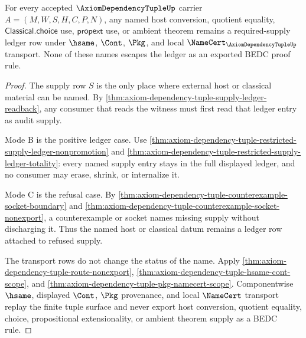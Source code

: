 \begin{theorem}
\label{thm:axiom-dependency-tuple-host-supply-nonescape}
For every accepted $\AxiomDependencyTupleUp$ carrier
$A=(M,W,S,H,C,P,N)$, any named host conversion, quotient equality,
$\mathsf{Classical.choice}$ use, $\mathsf{propext}$ use, or ambient theorem
remains a required-supply ledger row under $\hsame$, $\Cont$, $\Pkg$, and local
$\NameCert_{\AxiomDependencyTupleUp}$ transport. None of these names escapes
the ledger as an exported BEDC proof rule.
\end{theorem}
\begin{proof}
The supply row $S$ is the only place where external host or classical material
can be named. By \autoref{thm:axiom-dependency-tuple-supply-ledger-readback},
any consumer that reads the witness must first read that ledger entry as audit
supply.

Mode B is the positive ledger case. Use
\autoref{thm:axiom-dependency-tuple-restricted-supply-ledger-nonpromotion} and
\autoref{thm:axiom-dependency-tuple-restricted-supply-ledger-totality}: every
named supply entry stays in the full displayed ledger, and no consumer may
erase, shrink, or internalize it.

Mode C is the refusal case. By
\autoref{thm:axiom-dependency-tuple-counterexample-socket-boundary} and
\autoref{thm:axiom-dependency-tuple-counterexample-socket-nonexport}, a
counterexample or socket names missing supply without discharging it. Thus the
named host or classical datum remains a ledger row attached to refused supply.

The transport rows do not change the status of the name. Apply
\autoref{thm:axiom-dependency-tuple-route-nonexport},
\autoref{thm:axiom-dependency-tuple-hsame-cont-scope}, and
\autoref{thm:axiom-dependency-tuple-pkg-namecert-scope}. Componentwise
$\hsame$, displayed $\Cont$, $\Pkg$ provenance, and local $\NameCert$ transport
replay the finite tuple surface and never export host conversion, quotient
equality, choice, propositional extensionality, or ambient theorem supply as a
BEDC rule.
\end{proof}


